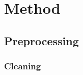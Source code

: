 \documentclass[11pt]{article}
\begin{document}





\section{Method}

\subsection{Preprocessing}

\subsubsection{Cleaning}
\end{document}
